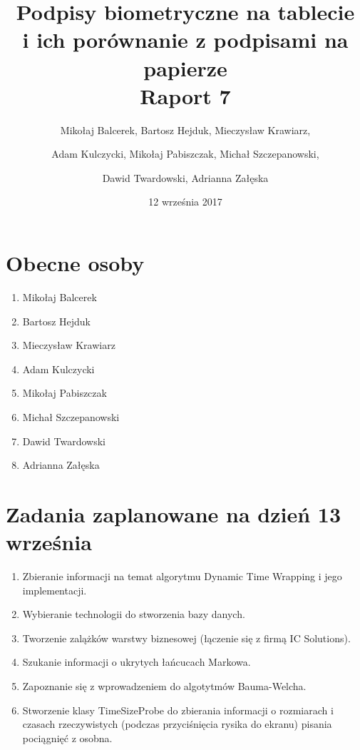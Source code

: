 \documentclass{mwrep}
\title{Podpisy biometryczne na tablecie \\ i ich porównanie z podpisami na papierze\\ 
Raport 7}
\author{Mikołaj Balcerek, Bartosz Hejduk, Mieczysław Krawiarz, \and Adam Kulczycki, Mikołaj Pabiszczak, Michał Szczepanowski, \and Dawid Twardowski, Adrianna Załęska}
\date{12 września 2017}
\begin{document}
\maketitle
{\let\clearpage\relax 
\chapter{Obecne osoby}}
\begin{enumerate}
    \item Mikołaj Balcerek
    \item Bartosz Hejduk
    \item Mieczysław Krawiarz
    \item Adam Kulczycki
    \item Mikołaj Pabiszczak
    \item Michał Szczepanowski
    \item Dawid Twardowski
    \item Adrianna Załęska
\end{enumerate}


{\let\clearpage\relax 
\chapter{Zadania zaplanowane na dzień 13 września}}
\begin{enumerate}
	\item Zbieranie informacji na temat algorytmu Dynamic Time Wrapping i jego implementacji.
	\item Wybieranie technologii do stworzenia bazy danych.
	\item Tworzenie zalążków warstwy biznesowej (łączenie się z firmą IC Solutions).
	\item Szukanie informacji o ukrytych łańcucach Markowa.
	\item Zapoznanie się z wprowadzeniem do algotytmów Bauma-Welcha.
	\item Stworzenie klasy TimeSizeProbe do zbierania informacji o rozmiarach i czasach rzeczywistych (podczas przyciśnięcia rysika do ekranu) pisania pociągnięć z osobna.
\end{enumerate}
\end{document}
